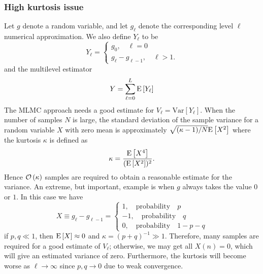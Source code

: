 \subsubsection{High kurtosis issue}\label{sec:General motivation}
Let $g$ denote a random variable, and let $g_{\ell}$ denote the corresponding level $\ell$ numerical approximation. We also define $Y_{\ell}$ to be
\[
 Y_{\ell}=\begin{cases}
               g_0,\quad \ell=0\\
               g_{\ell}-g_{\ell-1},\quad \ell>1.
            \end{cases}
\]
and the multilevel estimator 
\begin{equation}
Y=\sum_{\ell=0}^L \mathrm{E}\left[Y_{\ell}\right]
\end{equation}
The MLMC approach needs a good estimate for $V_{\ell}=\text{Var}[Y_{\ell}]$. When the number of samples $N$ is large, the standard deviation of the sample variance for a random variable $X$ with zero mean is approximately $\sqrt{(\kappa-1)/N} \mathrm{E}\left[X^2\right]$ where the kurtosis $\kappa$ is defined as
\begin{align}\label{eq:Kurtosis}
\kappa = \frac{\mathrm{E}\left[X^4\right]}{(\mathrm{E}\left[X^2\right])^2}.
\end{align}  
Hence ${\mathcal{O}}\left(\kappa\right)$ samples are required to obtain a reasonable estimate for the variance.  An extreme, but important, example is when $g$ always takes the value $0$ or $1$. In this case we have
\[
X \equiv g_{\ell}-g_{\ell-1}=\begin{cases}
               1,\quad \text{probability} \quad p\\
               -1,\quad \text{probability}\quad q\\
               0,\quad \text{probability} \quad 1-p-q
            \end{cases}
\]
if $p,q \ll 1$, then $\mathrm{E}\left[X\right] \approx0$  and $\kappa=(p+q)^{-1}\gg 1$. Therefore, many samples are required for a good estimate of $V_{\ell}$; otherwise, we may get all $X(n)=0$, which will give an estimated variance of zero. Furthermore, the kurtosis will become worse as $\ell \rightarrow \infty$ since $p,q \rightarrow0$ due to weak convergence.

